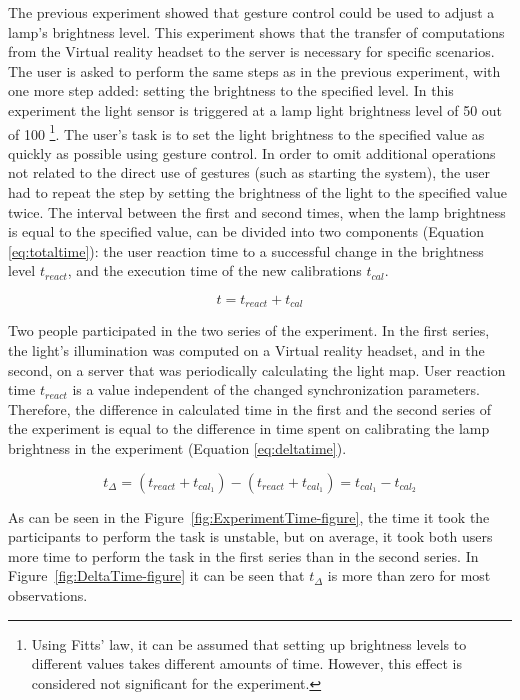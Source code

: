 The previous experiment showed that gesture control could be used to adjust a lamp's brightness level. This experiment shows that the transfer of computations from the Virtual reality headset to the server is necessary for specific scenarios. The user is asked to perform the same steps as in the previous experiment, with one more step added:  setting the brightness to the specified level. In this experiment the light sensor is triggered at a lamp light brightness level of 50 out of 100 \footnote{Using Fitts' law, it can be assumed that setting up brightness levels to different values takes different amounts of time. However, this effect is considered not significant for the experiment.}. The user's task is to set the light brightness to the specified value as quickly as possible using gesture control. In order to omit additional operations not related to the direct use of gestures (such as starting the system), the user had to repeat the step by setting the brightness of the light to the specified value twice. The interval between the first and second times, when the lamp brightness is equal to the specified value, can be divided into two components (Equation \eqref{eq:totaltime}): the user reaction time to a successful change in the brightness level $ t_{react} $, and the execution time of the new calibrations $ t_{cal} $.


\begin{equation}
  t = t_{react} + t_{cal}
  \label{eq:totaltime}
\end{equation}

Two people participated in the two series of the experiment. In the first series, the light's illumination was computed on a Virtual reality headset, and in the second, on a server that was periodically calculating the light map. User reaction time $ t_{react} $ is a value independent of the changed synchronization parameters. Therefore, the difference in calculated time in the first and the second series of the experiment is equal to the difference in time spent on calibrating the lamp brightness in the experiment (Equation \eqref{eq:deltatime}).

\begin{equation}
  t _{\Delta} = (t_{react} + t_{cal_1}) - (t_{react} + t_{cal_1}) = t_{cal_1} - t_{cal_2}
  \label{eq:deltatime}
\end{equation}

As can be seen in the Figure~\ref{fig:ExperimentTime-figure}, the time it took the participants to perform the task is unstable, but on average, it took both users more time to perform the task in the first series than in the second series. In Figure~\ref{fig:DeltaTime-figure} it can be seen that $t_{\Delta}$ is more than zero for most observations.

